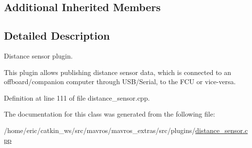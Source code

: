 \subsection*{Additional Inherited Members}


\subsection{Detailed Description}
Distance sensor plugin. 

This plugin allows publishing distance sensor data, which is connected to an offboard/companion computer through U\+S\+B/\+Serial, to the F\+CU or vice-\/versa. 

Definition at line 111 of file distance\+\_\+sensor.\+cpp.



The documentation for this class was generated from the following file\+:\begin{DoxyCompactItemize}
\item 
/home/eric/catkin\+\_\+ws/src/mavros/mavros\+\_\+extras/src/plugins/\mbox{\hyperlink{distance__sensor_8cpp}{distance\+\_\+sensor.\+cpp}}\end{DoxyCompactItemize}
